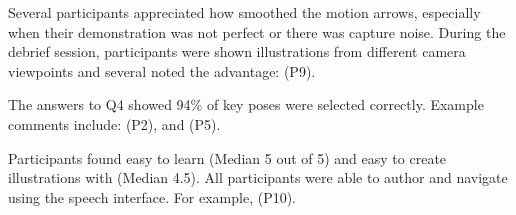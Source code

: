 %
Several participants appreciated how \systemname{} smoothed the motion arrows, especially when their demonstration was not perfect or there was capture noise.
%
During the debrief session, participants were shown  illustrations from different  camera viewpoints and several noted the advantage:  (P9).

The answers to Q4 showed 94\% of key poses were selected correctly. Example comments include:
 (P2), and
 (P5).
%

Participants found \systemname{} easy to learn (Median 5 out of 5) and easy to create illustrations with (Median 4.5).
%
All participants were able to author and navigate using the speech interface. For example,
 (P10).

